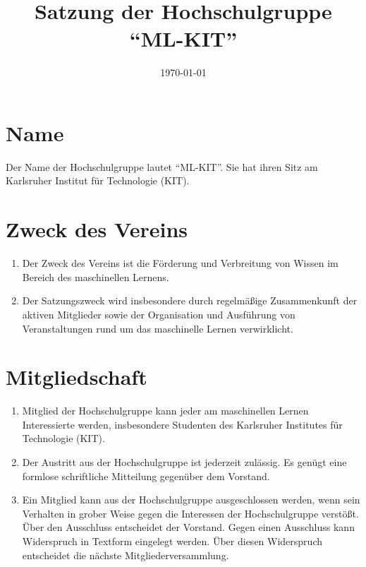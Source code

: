 \documentclass[a4paper]{scrartcl}
\newcommand\GruppenName{ML-KIT}
\begin{document}
 \author{}
\title{Satzung der Hochschulgruppe \\ \enquote{\GruppenName{}}}
\date{\today}
\maketitle

\section{Name}
Der Name der Hochschulgruppe lautet \enquote{\GruppenName{}}. Sie hat ihren
Sitz am Karlsruher Institut für Technologie (KIT).

\section{Zweck des Vereins}
\begin{enumerate}
    \item Der Zweck des Vereins ist die Förderung und Verbreitung von Wissen
          im Bereich des maschinellen Lernens.
    \item Der Satzungszweck wird insbesondere durch regelmäßige
          Zusammenkunft der aktiven Mitglieder sowie der Organisation und
          Ausführung von Veranstaltungen rund um das maschinelle Lernen
          verwirklicht.
\end{enumerate}

\section{Mitgliedschaft}
\begin{enumerate}
    \item Mitglied der Hochschulgruppe kann jeder am maschinellen Lernen
          Interessierte werden, insbesondere Studenten des Karlsruher
          Institutes für Technologie (KIT).
    \item Der Austritt aus der Hochschulgruppe ist jederzeit zulässig. Es
          genügt eine formlose schriftliche Mitteilung gegenüber dem Vorstand.
    \item Ein Mitglied kann aus der Hochschulgruppe ausgeschlossen werden, wenn
          sein Verhalten in grober Weise gegen die Interessen der
          Hochschulgruppe verstößt. Über den Ausschluss entscheidet der
          Vorstand. Gegen einen Ausschluss kann Widerspruch in Textform
          eingelegt werden. Über diesen Widerspruch entscheidet die nächste
          Mitgliederversammlung.
\end{enumerate}
\end{document}
